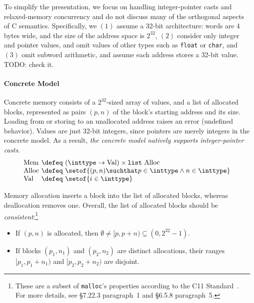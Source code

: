 To simplify the presentation, we focus on handling integer-pointer casts and relaxed-memory
concurrency and do not discuss many of the orthogonal aspects of C semantics.  Specifically, we
$(1)$ assume a 32-bit architecture: words are 4 bytes wide, and the size of the address space is
$2^{32}$, $(2)$ consider only integer and pointer values, and omit values of other types such as
\texttt{float} or \texttt{char}, and $(3)$ omit subword arithmetic, and assume each address stores a
32-bit value.  TODO: check it.


\paragraph{Concrete Model}

Concrete memory consists of a $2^{32}$-sized array of values, and a
list of allocated blocks, 
represented as pairs $(p,n)$ of the block's starting address and its size.
Loading from or storing to an unallocated address raises
an error (\ie undefined behavior).  Values are just 32-bit integers,
since pointers are merely integers in the concrete model.
As a result, \emph{the concrete model natively supports integer-pointer casts}.
\[
\begin{array}{@{}l@{~}c@{~}l@{}}
\mathrm{Mem} &\defeq& (\inttype \to \mathrm{Val}) \times \mathtt{list}\ \mathrm{Alloc} \\
\mathrm{Alloc} &\defeq& \setof{(p,n) \suchthat p \in \inttype \land n \in \inttype} \\
\mathrm{Val} &\defeq& \setof{i\in\inttype}
\end{array}
\]

Memory allocation inserts a block into the list of allocated blocks, 
whereas deallocation removes one.  Overall, the list of allocated 
blocks should be \emph{consistent}:\footnote{These are a subset of 
  \texttt{malloc}'s properties according to the C11 Standard~\cite{iso2011iec}. 
  For more details, see \S7.22.3 paragraph~1 and \S6.5.8 paragraph~5.}
\begin{itemize}
\item If $(p, n)$ is allocated, then $\emptyset \neq [p,p+n) \subseteq
  (0,2^{32}-1)$.
\item If blocks $(p_1, n_1)$ and $(p_2, n_2)$ are distinct
  allocations, their ranges $[p_1,p_1+n_1)$ and $[p_2,p_2+n_2)$
  are disjoint.
\end{itemize}

